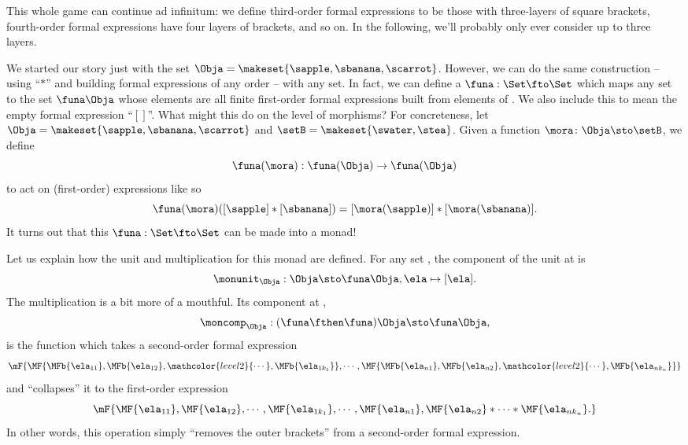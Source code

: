 This whole game can continue ad infinitum: we define third-order formal expressions to be those with three-layers of square brackets, fourth-order formal expressions have four layers of brackets, and so on.
In the following, we'll probably only ever consider up to three layers.

We started our story just with the set $\Obja = \makeset{ \sapple, \sbanana, \scarrot }$.
However, we can do the same construction -- using ``$*$'' and building formal expressions of any order -- with any set.
In fact, we can define a  $\funa: \Set \fto \Set$ which maps any set \Obja to the set $\funa \Obja$ whose elements are all finite first-order formal expressions built from elements of \Obja.
We also include this to mean the empty formal expression ``$[ ]$''.
What might this  do on the level of morphisms?
For concreteness, let $\Obja = \makeset{ \sapple, \sbanana, \scarrot } $ and $\setB = \makeset{ \swater, \stea }$.
Given a function $\mora \colon \Obja \sto \setB$, we define
\begin{equation}
    \funa(\mora) : \funa(\Obja) \to \funa(\Obja)
\end{equation}
to act on (first-order) expressions like so
\begin{equation}
    \funa(\mora)([\sapple]*[\sbanana]) = [\mora(\sapple)]*[\mora(\sbanana)].
\end{equation}
It turns out that this  $\funa: \Set \fto \Set$ can be made into a monad!

Let us explain how the unit and multiplication for this monad are defined.
For any set \Obja, the component of the unit at \Obja is
\begin{equation}
    \monunit_\Obja : \Obja \sto \funa \Obja, \ela \mapsto [\ela].
\end{equation}
The multiplication is a bit more of a mouthful.
Its component at \Obja,
\begin{equation}
    \moncomp_\Obja : (\funa \fthen \funa)\Obja \sto \funa \Obja,
\end{equation}
is the function which takes a second-order formal expression
\begin{equation}\label{eq:monad-formatl-mult-input}
    \mF{
        \MF{ \MFb{\ela_{11}} , \MFb{\ela_{12}} , \mathcolor{level2}{\cdots} , \MFb{\ela_{1k_1}}}
        , \cdots ,
        \MF{\MFb{\ela_{n1}}, \MFb{\ela_{n2}}, \mathcolor{level2}{\cdots} , \MFb{\ela_{nk_n}}}
    }
\end{equation}
and ``collapses'' it to the first-order expression
\begin{equation}\label{eq:monad-formatl-mult-output}
    \mF { \MF{\ela_{11}}
        , \MF{\ela_{12}} , \cdots , \MF{\ela_{1k_1}}, \cdots, \MF{\ela_{n1}} , \MF{\ela_{n2}} * \cdots * \MF{\ela_{nk_n}}.
    }
\end{equation}
In other words, this operation simply ``removes the outer brackets'' from a second-order formal expression.

